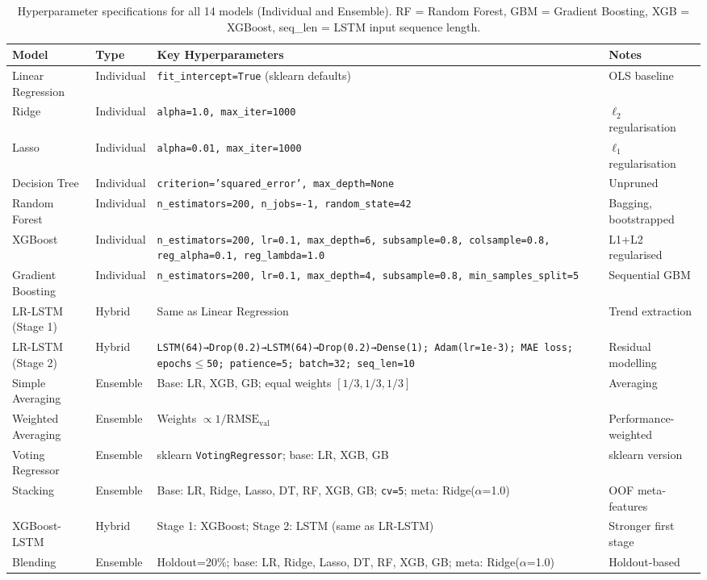 \documentclass[a4paper,fleqn]{cas-dc}
\begin{document}
\begin{table}[t]
\centering
\caption{Hyperparameter specifications for all 14 models (Individual and Ensemble). RF = Random Forest, GBM = Gradient Boosting, XGB = XGBoost, seq\_len = LSTM input sequence length.\label{tab:hyperparams}}
\small
\begin{tabular}{@{}p{3.2cm}p{1.6cm}p{7.6cm}p{2.8cm}@{}}
\toprule
\textbf{Model} & \textbf{Type} & \textbf{Key Hyperparameters} & \textbf{Notes} \\
\toprule
Linear Regression & Individual & \texttt{fit\_intercept=True} (sklearn defaults) & OLS baseline \\
Ridge & Individual & \texttt{alpha=1.0, max\_iter=1000} & $\ell_2$ regularisation \\
Lasso & Individual & \texttt{alpha=0.01, max\_iter=1000} & $\ell_1$ regularisation \\
Decision Tree & Individual & \texttt{criterion='squared\_error', max\_depth=None} & Unpruned \\
Random Forest & Individual & \texttt{n\_estimators=200, n\_jobs=-1, random\_state=42} & Bagging, bootstrapped \\
XGBoost & Individual & \texttt{n\_estimators=200, lr=0.1, max\_depth=6, subsample=0.8, colsample=0.8, reg\_alpha=0.1, reg\_lambda=1.0} & L1+L2 regularised \\
Gradient Boosting & Individual & \texttt{n\_estimators=200, lr=0.1, max\_depth=4, subsample=0.8, min\_samples\_split=5} & Sequential GBM \\
LR-LSTM (Stage 1) & Hybrid & Same as Linear Regression & Trend extraction \\
LR-LSTM (Stage 2) & Hybrid & \texttt{LSTM(64)→Drop(0.2)→LSTM(64)→Drop(0.2)→Dense(1); Adam(lr=1e-3); MAE loss; epochs$\le$50; patience=5; batch=32; seq\_len=10} & Residual modelling \\
Simple Averaging & Ensemble & Base: LR, XGB, GB; equal weights $[1/3,1/3,1/3]$ & Averaging \\
Weighted Averaging & Ensemble & Weights $\propto 1/\text{RMSE}_{\text{val}}$ & Performance-weighted \\
Voting Regressor & Ensemble & sklearn \texttt{VotingRegressor}; base: LR, XGB, GB & sklearn version \\
Stacking & Ensemble & Base: LR, Ridge, Lasso, DT, RF, XGB, GB; \texttt{cv=5}; meta: Ridge($\alpha$=1.0) & OOF meta-features \\
XGBoost-LSTM & Hybrid & Stage 1: XGBoost; Stage 2: LSTM (same as LR-LSTM) & Stronger first stage \\
Blending & Ensemble & Holdout=20\%; base: LR, Ridge, Lasso, DT, RF, XGB, GB; meta: Ridge($\alpha$=1.0) & Holdout-based \\
\bottomrule
\end{tabular}
\end{table}
\end{document}
